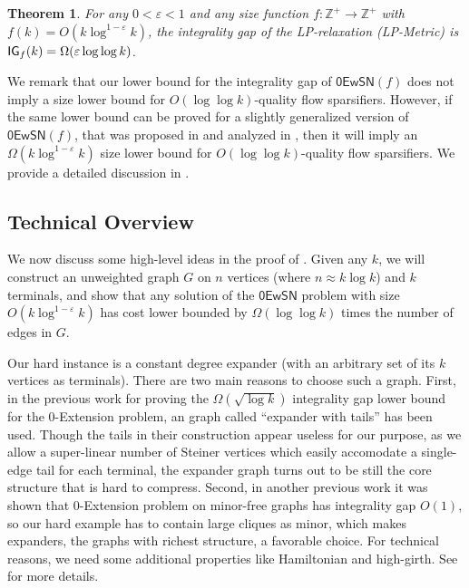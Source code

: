 \documentclass[11pt]{article}
\newtheorem{theorem}{Theorem}[section]
\theoremstyle{definition}
\newcommand{\eps}{{\varepsilon}}
\newcommand{\zesn}{\mathsf{0EwSN}}
\begin{document}
\begin{theorem}
\label{thm: 0-ext with Steiner lower}
For any $0<\eps<1$ and any size function $f:\mathbb{Z}^+\to \mathbb{Z}^+$ with $f(k)=O(k\log^{1-\eps} k)$, 
the integrality gap of the LP-relaxation (\textnormal{\textsf{LP-Metric}}) is $\textnormal{\textsf{IG}}_f(k)=\Omega(\eps \log\log k)$.
\end{theorem}



We remark that our lower bound for the integrality gap of $\zesn(f)$ does not imply a size lower bound for $O(\log\log k)$-quality flow sparsifiers. However, if the same lower bound can be proved for a slightly generalized version of $\zesn(f)$, that was proposed in \cite{andoni2014towards} and analyzed in \cite{chen20241+}, then it will imply an $\Omega(k\log^{1-\eps} k)$ size lower bound for $O(\log\log k)$-quality flow sparsifiers. We provide a detailed discussion in .

\subsection{Technical Overview}

We now discuss some high-level ideas in the proof of  . Given any $k$, we will construct an unweighted graph $G$ on $n$ vertices (where $n\approx k\log k$) and $k$ terminals, and show that any solution of the $\zesn$ problem with size $O(k\log^{1-\eps} k)$ has cost lower bounded by $\Omega(\log\log k)$ times the number of edges in $G$.

Our hard instance is a constant degree expander (with an arbitrary set of its $k$ vertices as terminals). There are two main reasons to choose such a graph. First, in the previous work \cite{calinescu2005approximation} for proving the $\Omega(\sqrt{\log k})$ integrality gap lower bound for the $0$-Extension problem, an graph called ``expander with tails'' has been used. Though the tails in their construction appear useless for our purpose, as we allow a super-linear number of Steiner vertices which easily accomodate a single-edge tail for each terminal, the expander graph turns out to be still the core structure that is hard to compress.
Second, in another previous work \cite{archer2004approximate} it was shown that $0$-Extension problem on minor-free graphs has integrality gap $O(1)$, so our hard example has to contain large cliques as minor, which makes expanders, the graphs with richest structure,  a favorable choice. For technical reasons, we need some additional properties like Hamiltonian and high-girth. See  for more details.
\end{document}
